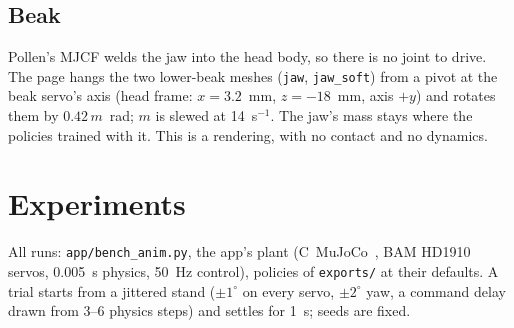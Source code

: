 \documentclass[11pt]{article}
\newcommand{\code}[1]{\texttt{\small #1}}
\begin{document}
\subsection{Beak}
Pollen's MJCF welds the jaw into the head body, so there is no joint to drive. The page hangs the two lower-beak
meshes (\code{jaw}, \code{jaw\_soft}) from a pivot at the beak servo's axis (head frame: $x=3.2$~mm, $z=-18$~mm,
axis $+y$) and rotates them by $0.42\,m$~rad; $m$ is slewed at 14~s$^{-1}$. The jaw's mass stays where the policies
trained with it. This is a rendering, with no contact and no dynamics.

\section{Experiments}\label{sec:exp}
All runs: \code{app/bench\_anim.py}, the app's plant (C~MuJoCo~\cite{mujoco}, BAM HD1910 servos, 0.005~s physics, 50~Hz control),
policies of \code{exports/} at their defaults. A trial starts from a jittered stand ($\pm1^\circ$ on every servo,
$\pm2^\circ$ yaw, a command delay drawn from 3--6 physics steps) and settles for 1~s; seeds are fixed.
\end{document}
